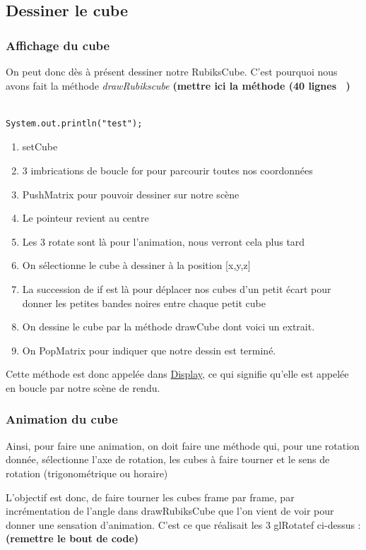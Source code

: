 \subsection{Dessiner le cube}
\subsubsection{Affichage du cube}
On peut donc dès à présent dessiner notre RubiksCube. C’est pourquoi nous avons fait la méthode \textit{drawRubikscube} 
\textbf{(mettre ici la méthode (40 lignes ~)}
\begin{lstlisting}[frame=single]  % Start your code-block

System.out.println("test");

\end{lstlisting}


\begin{enumerate}
    \item setCube
    \item 3 imbrications de boucle for pour parcourir toutes nos coordonnées
    \item PushMatrix pour pouvoir dessiner sur notre scène
    \item Le pointeur revient au centre
    \item Les 3 rotate sont là pour l’animation, nous verront cela plus tard
    \item On sélectionne le cube à dessiner à la position [x,y,z]
    \item La succession de if est là pour déplacer nos cubes d’un petit écart pour donner les petites bandes noires entre chaque petit cube
    \item On dessine le cube par la méthode drawCube dont voici un extrait.
    \item On PopMatrix pour indiquer que notre dessin est terminé.
\end{enumerate}

Cette méthode est donc appelée dans \underline{Display}, ce qui signifie qu’elle est appelée en boucle par notre scène de rendu.

\subsubsection{Animation du cube}
Ainsi, pour faire une animation, on doit faire une méthode qui, pour une rotation donnée, sélectionne l’axe de rotation, les cubes à faire tourner et le sens de rotation (trigonométrique ou horaire)

L’objectif est donc, de faire tourner les cubes frame par frame, par incrémentation de l’angle dans drawRubiksCube que l’on vient de voir pour donner une sensation d’animation. C’est ce que réalisait les 3 glRotatef ci-dessus :  \textbf{(remettre le bout de code)}

